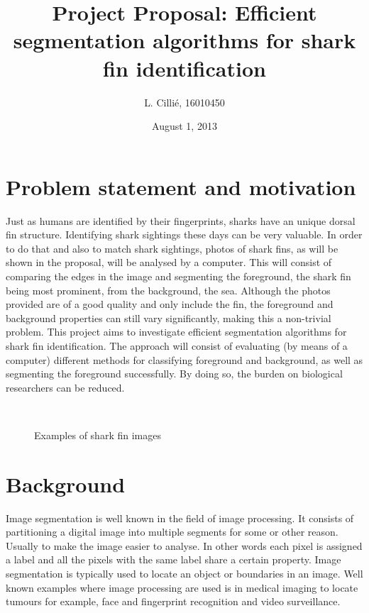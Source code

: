 \documentclass[a4paper,10pt]{article}
\title{Project Proposal: Efficient segmentation algorithms for shark fin
identification}
\author{L. Cilli\'{e}, 16010450}
\date{August 1, 2013}
\begin{document}
\maketitle
\lstset{language=Matlab}

\newpage
\tableofcontents
\newpage

\section{Problem statement and motivation}  
Just as humans are identified by their fingerprints, sharks have an unique
dorsal fin structure.  Identifying shark sightings these days can be very
valuable.  In order to do that and also to match shark sightings, photos of
shark fins, as will be shown in the proposal, will be analysed by a computer. 
This will consist of comparing the edges in the image and segmenting the
foreground, the shark fin being most prominent,  from the background, the sea. 
Although the photos provided are of a good quality and only include the fin, the
foreground and background properties can still vary significantly, making this a
non-trivial problem.  This project aims to investigate efficient segmentation
algorithms for shark fin identification.  The approach will consist of
evaluating (by means of a computer) different methods for classifying foreground
and background, as well as segmenting the foreground successfully.  By doing so,
the burden on biological researchers can be reduced. 

\begin{figure}[H]
\centering
\mbox{ \quad
{}}
\caption{Examples of shark fin images}
\end{figure}

\section{Background}
Image segmentation is well known in the field of image processing.  It consists
of partitioning a digital image into multiple segments for some or other reason.
 Usually to make the image easier to analyse.  In other words each pixel is
assigned a label and all the pixels with the same label share a certain
property.  Image segmentation is typically used to locate an object or
boundaries in an image.  Well known examples where image processing are used is
in medical imaging to locate tumours for example, face and
fingerprint recognition and video surveillance.
\end{document}
